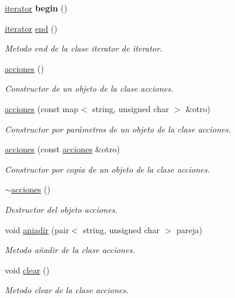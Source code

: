 \begin{DoxyCompactItemize}
\item 
\mbox{\label{classacciones_a8a8505fee27acdbe0f295d3ab951c06a}} 
\hyperlink{classacciones_1_1iterator}{iterator} {\bfseries begin} ()
\item 
\hyperlink{classacciones_1_1iterator}{iterator} \hyperlink{classacciones_a39de840fe3c70af83b239d6207fa70a0}{end} ()
\begin{DoxyCompactList}\small\item\em Metodo end de la clase iterator de iterator. \end{DoxyCompactList}\item 
\hyperlink{classacciones_a557bc0964d2a7c1859b01f57303ecea0}{acciones} ()
\begin{DoxyCompactList}\small\item\em Constructor de un objeto de la clase acciones. \end{DoxyCompactList}\item 
\hyperlink{classacciones_a48c692cc6783fc3b06ab3dd58f13c17d}{acciones} (const map$<$ string, unsigned char $>$ \&otro)
\begin{DoxyCompactList}\small\item\em Constructor por parámetros de un objeto de la clase acciones. \end{DoxyCompactList}\item 
\hyperlink{classacciones_a70cd0d32a95500c4d8d09f3baef1e9a2}{acciones} (const \hyperlink{classacciones}{acciones} \&otro)
\begin{DoxyCompactList}\small\item\em Constructor por copia de un objeto de la clase acciones. \end{DoxyCompactList}\item 
\hyperlink{classacciones_a0b92ef93429a415fa57aad7097a135ef}{$\sim$acciones} ()
\begin{DoxyCompactList}\small\item\em Destructor del objeto acciones. \end{DoxyCompactList}\item 
void \hyperlink{classacciones_ae661f2bc251f1b89103cac9f9b79073e}{aniadir} (pair$<$ string, unsigned char $>$ pareja)
\begin{DoxyCompactList}\small\item\em Metodo añadir de la clase acciones. \end{DoxyCompactList}\item 
void \hyperlink{classacciones_a465554da68fa2ce846719fa0f5ec0ea4}{clear} ()
\begin{DoxyCompactList}\small\item\em Metodo clear de la clase acciones. \end{DoxyCompactList}\end{DoxyCompactItemize}
